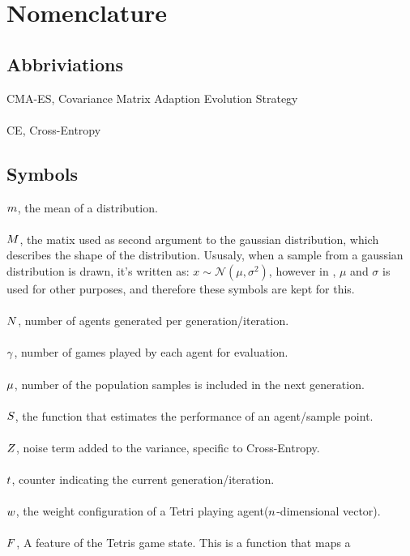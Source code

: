 \section{Nomenclature}

\subsection{Abbriviations}
CMA-ES, Covariance Matrix Adaption Evolution Strategy\\
\\
CE, Cross-Entropy

\subsection{Symbols}

$m$, the mean of a distribution.\\
\\
$M$, the matix used as second argument to the gaussian distribution, which describes the shape of the distribution. Ususaly, when a sample from a gaussian distribution 
is drawn, it's written as: $x \sim \mathcal{N} \left( \mu, \sigma^{2} \right)$, however in \citep{hansen2011},
$\mu$ and $\sigma$ is used for other purposes, and therefore these symbols are kept for this.\\
\\
$N$, number of agents generated per generation/iteration.\\
\\
$\gamma$, number of games played by each agent for evaluation.\\
\\
$\mu$, number of the population samples is included in the next generation.\\
\\
$S$, the function that estimates the performance of an agent/sample point.\\
\\
$Z$, noise term added to the variance, specific to Cross-Entropy.\\
\\
$t$, counter indicating the current generation/iteration.\\
\\
$w$, the weight configuration of a Tetri playing agent($n $-dimensional vector).\\
\\
$F$, A feature of the Tetris game state. This is a function that maps a 
